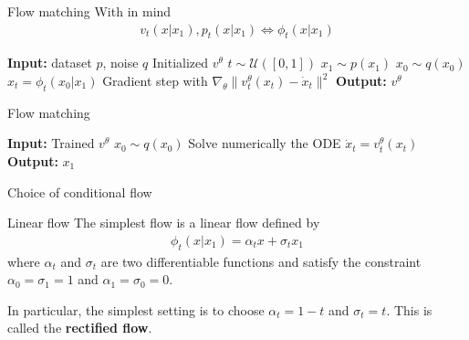 \documentclass{beamer}
\begin{document}
\begin{frame}{Flow matching}
    With in mind 
    \begin{align*}
        v_t(x|x_1),p_t(x|x_1)\iff \phi_t(x|x_1)
    \end{align*}
    \begin{algorithm}[H]
        \caption{Flow matching training}\label{alg:flow_matching_training}
            \begin{algorithmic}
                \State \textbf{Input:} dataset \(p\), noise \(q\)
                \State Initialized \(v^\theta\)
                    \State \(t\sim\mathcal{U}([0,1])\)
                    \State \(x_1\sim p(x_1)\)
                    \State \(x_0\sim q(x_0)\)
                    \State \(x_t=\phi_t(x_0|x_1)\)
                    \State Gradient step with \(\nabla_\theta \| v_t^\theta (x_t) -\dot{x}_t \|^2\)
                \EndWhile
                \State \textbf{Output:} \(v^\theta\)
            \end{algorithmic}
        \end{algorithm}
\end{frame}

\begin{frame}{Flow matching}
    \begin{algorithm}[H]
        \caption{Flow matching sampling}\label{alg:flow_matching_sampling}
            \begin{algorithmic}
                \State \textbf{Input:} Trained \(v^\theta\)
                \State \(x_0\sim q(x_0)\)
                \State Solve numerically the ODE \(\dot{x}_t=v_t^\theta(x_t)\)
                \State \textbf{Output:} \(x_1\)
            \end{algorithmic}
    \end{algorithm}
\end{frame}

\begin{frame}{Choice of conditional flow}
    \begin{block}{Linear flow}
        The simplest flow is a linear flow defined by
        \begin{align}
            \phi_t(x|x_1)=\alpha_t x+\sigma_t x_1
        \end{align}
        where \(\alpha_t\) and \(\sigma_t\) are two differentiable functions and satisfy the constraint \(\alpha_0=\sigma_1=1\) and \(\alpha_1=\sigma_0=0\).

        \bigskip
        In particular, the simplest setting is to choose \(\alpha_t=1-t \) and \(\sigma_t=t\). This is called the \textbf{rectified flow}.
    \end{block}
\end{frame}
\end{document}
